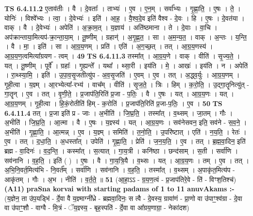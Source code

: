 \documentclass[17pt]{extarticle}
\begin{document}
                  \newline
                                \textbf{ TS 6.4.11.2} \newline
                  ए॒ताव॑तीः । वै । दे॒वताः᳚ । ताभ्यः॑ । ए॒व । ए॒न॒म् । सर्वा᳚भ्यः । गृ॒ह्णा॒ति॒ । ए॒षः । ते॒ । योनिः॑ । विश्वे᳚भ्यः । त्वा॒ । दे॒वेभ्यः॑ । इति॑ । आ॒ह॒ । वै॒श्व॒दे॒व इति॑ वैश्व - दे॒वः । हि । ए॒षः । दे॒वत॑या । वाक् । वै । दे॒वेभ्यः॑ । अपेति॑ । अ॒क्रा॒म॒त् । य॒ज्ञाय॑ । अति॑ष्ठमाना । ते । दे॒वाः । वा॒चि । अप॑क्रान्ताया॒मित्यप॑-क्रा॒न्ता॒या॒म् । तू॒ष्णीम् । ग्रहान्॑ । अ॒गृ॒ह्ण॒त॒ । सा । अ॒म॒न्य॒त॒ । वाक् । अ॒न्तः । य॒न्ति॒ । वै । मा॒ । इति॑ । सा । आ॒ग्र॒य॒णम् । प्रति॑ । एति॑ । अ॒ग॒च्छ॒त् । तत् । आ॒ग्र॒य॒णस्य॑ । आ॒ग्र॒य॒ण॒त्वमित्या᳚ग्रयण - त्वम् । \textbf{  49} \newline
                  \newline
                                \textbf{ TS 6.4.11.3} \newline
                  तस्मा᳚त् । आ॒ग्र॒य॒णे । वाक् । वीति॑ । सृ॒ज्य॒ते॒ । यत् । तू॒ष्णीम् । पूर्वे᳚ । ग्रहाः᳚ । गृ॒ह्यन्ते᳚ । यथा᳚ । थ्सा॒री । इय॑ति । मे॒ । आखः॑ । इय॑ति । न । अपेति॑ । रा॒थ्स्या॒मि॒ । इति॑ । उ॒पा॒व॒सृ॒जतीत्यु॑प - अ॒व॒सृ॒जति॑ । ए॒वम् । ए॒व । तत् । अ॒द्ध्व॒र्युः । आ॒ग्र॒य॒णम् । गृ॒ही॒त्वा । य॒ज्ञ्म् । आ॒रभ्येत्या᳚-रभ्य॑ । वाच᳚म् । वीति॑ । सृ॒ज॒ते॒ । त्रिः । हिम् । क॒रो॒ति॒ । उ॒द्गा॒तॄनित्यु॑त् - गा॒तॄन् । ए॒व । तत् । वृ॒णी॒ते॒ । प्र॒जाप॑ति॒रिति॑ प्र॒जा - प॒तिः॒ । वै । ए॒षः । यत् । आ॒ग्र॒य॒णः । यत् । आ॒ग्र॒य॒णम् । गृ॒ही॒त्वा । हि॒कं॒रोतीति॑ हिम् - क॒रोति॑ । प्र॒जाप॑ति॒रिति॑ प्र॒जा-प॒तिः॒ । ए॒व । \textbf{  50} \newline
                  \newline
                                \textbf{ TS 6.4.11.4} \newline
                  तत् । प्र॒जा इति॑ प्र - जाः । अ॒भीति॑ । जि॒घ्र॒ति॒ । तस्मा᳚त् । व॒थ्सम् । जा॒तम् । गौः । अ॒भीति॑ । जि॒घ्र॒ति॒ । आ॒त्मा । वै । ए॒षः । य॒ज्ञ्स्य॑ । यत् । आ॒ग्र॒य॒णः । सव॑नेसवन॒ इति॒ सव॑ने - स॒व॒ने॒ । अ॒भीति॑ । गृ॒ह्णा॒ति॒ । आ॒त्मन्न् । ए॒व । य॒ज्ञ्म् । समिति॑ । त॒नो॒ति॒ । उ॒परि॑ष्टात् । एति॑ । न॒य॒ति॒ । रेतः॑ । ए॒व । तत् । द॒धा॒ति॒ । अ॒धस्ता᳚त् । उपेति॑ । गृ॒ह्णा॒ति॒ । प्रेति॑ । ज॒न॒य॒ति॒ । ए॒व । तत् । ब्र॒ह्म॒वा॒दिन॒ इति॑ ब्रह्म - वा॒दिनः॑ । व॒द॒न्ति॒ । कस्मा᳚त् । स॒त्यात् । गा॒य॒त्री । कनि॑ष्ठा । छन्द॑साम् । स॒ती । सर्वा॑णि । सव॑नानि । व॒ह॒ति॒ । इति॑ ( ) । ए॒षः । वै । गा॒य॒त्रि॒यै । व॒थ्सः । यत् । आ॒ग्र॒य॒णः । तम् । ए॒व । तत् । अ॒भि॒नि॒वर्त॒मित्य॑भि - नि॒वर्त᳚म् । सर्वा॑णि । सव॑नानि । व॒ह॒ति॒ । तस्मा᳚त् । व॒थ्सम् । अ॒पाकृ॑त॒मित्य॑प - आकृ॑तम् । गौः । अ॒भ । नीति॑ । व॒र्त॒ते॒ ॥ \textbf{  51} \newline
                  \newline
                      (आ॒हा॒ऽऽ - ग्र॒य॒ण॒त्वं - प्र॒जाप॑तिरे॒वे - ति॑ - विꣳश॒तिश्च॑)  \textbf{(A11)} \newline \newline
\textbf{praSna korvai with starting padams of 1 to 11 anuvAkams :-} \newline
(य॒ज्ञेन॒ ता उ॑प॒यड्भि॑ - र्दे॒वा वै य॒ज्ञ्माग्नी᳚ध्रे - ब्रह्मवा॒दिनः॒ स त्वै - दे॒वस्य॒ ग्रावा॑णं - प्रा॒णो वा उ॑पाꣳ॒॒श्व॑ग्रा - दे॒वा वा उ॑पाꣳ॒॒शौ - वाग्वै - मि॒त्रं - ॅय॒ज्ञ्स्य॒ - बृह॒स्पति॑ - र्दे॒वा वा आ᳚ग्रय॒णाग्रा॒ - नेका॑दश) \newline
\end{document}
